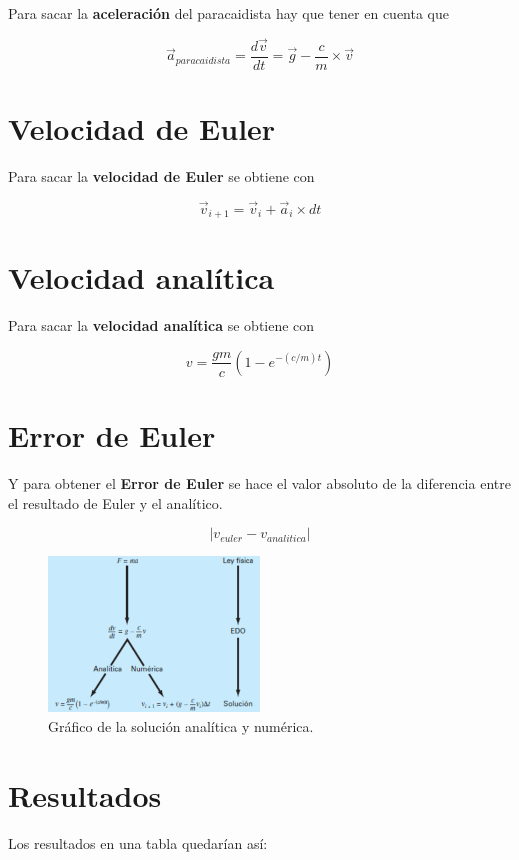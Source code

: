 \documentclass{article}
\begin{document}
Para sacar la \textbf{aceleración} del paracaidista hay que tener en cuenta que

\[
\vec{a}_{paracaidista} = \frac{d\vec{v}}{dt} = \vec{g} - \frac{c}{m} \times \vec{v}
\]

\section{Velocidad de Euler}

Para sacar la \textbf{velocidad de Euler} se obtiene con

\[
\vec{v}_{i+1} = \vec{v}_i + \vec{a}_{i} \times dt
\]

\section{Velocidad analítica}

Para sacar la \textbf{velocidad analítica} se obtiene con

\[
v = \frac{gm}{c}(1 - e^{-(c/m)t})
\]

\section{Error de Euler}

Y para obtener el \textbf{Error de Euler} se hace el valor absoluto de la diferencia entre el resultado de Euler y el analítico.

\[
\left| v_{euler} - v_{analitica} \right|
\]

\begin{figure}[htbp]
    \centering
    \includegraphics[width=0.5\textwidth]{AnaliticaNumerica.png}
    \caption{Gráfico de la solución analítica y numérica.}
\end{figure}
\newpage
\section{Resultados}

Los resultados en una tabla quedarían así:
\end{document}
